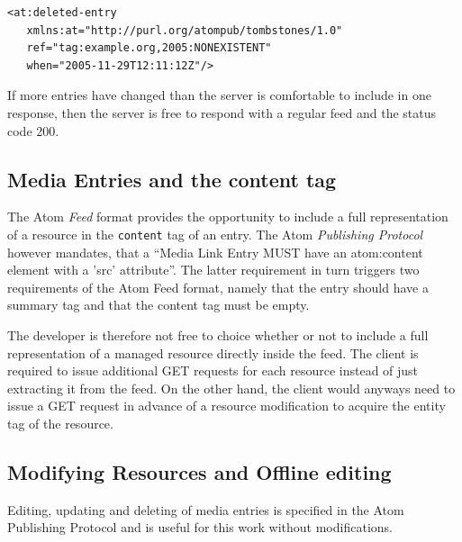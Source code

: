 \documentclass[11pt,a4paper,headsepline,twoside]{scrartcl}		%
\newcommand{\citeurl}[2]{\url{#1} (#2)}
\begin{document}
\begin{lstlisting}
<at:deleted-entry
   xmlns:at="http://purl.org/atompub/tombstones/1.0"
   ref="tag:example.org,2005:NONEXISTENT"
   when="2005-11-29T12:11:12Z"/>
\end{lstlisting}

If more entries have changed than the server is comfortable to include in one
response, then the server is free to respond with a regular feed and the status
code 200.

\subsection{Media Entries and the content tag}
\label{sec:inline-feeds-or}

The Atom \textit{Feed} format provides the opportunity to include a full
representation of a resource in the \lstinline:content: tag of an
entry\cite[sec. 4.1.3]{RFC4287}. The Atom \textit{Publishing Protocol} however
mandates, that a ``Media Link Entry MUST have an atom:content element with a
'src' attribute''\cite[sec. 9.6]{RFC5023}. The latter requirement in turn
triggers two requirements of the Atom Feed format, namely that the entry should
have a summary tag and that the content tag must be
empty\cite[sec. 4.1.1.1,4.1.3.2]{RFC4287}.

The developer is therefore not free to choice whether or not to include a full
representation of a managed resource directly inside the feed. The client is
required to issue additional GET requests for each resource instead of just
extracting it from the feed. On the other hand, the client would anyways need to
issue a GET request in advance of a resource modification to acquire the entity
tag of the resource.

\subsection{Modifying Resources and Offline editing}

Editing, updating and deleting of media entries is specified in the Atom
Publishing Protocol and is useful for this work without modifications.

\end{document}

